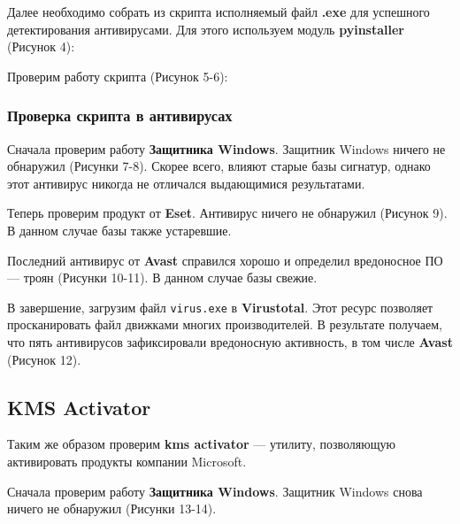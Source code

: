 Далее необходимо собрать из скрипта исполняемый файл \textbf{.exe} для успешного детектирования антивирусами. Для этого используем модуль \textbf{pyinstaller} \linebreak (Рисунок 4):

\FloatBarrier

Проверим работу скрипта (Рисунок 5-6):

\FloatBarrier


\subsubsection{Проверка скрипта в антивирусах}

Сначала проверим работу \textbf{Защитника Windows}. Защитник Windows ничего не обнаружил (Рисунки 7-8). Скорее всего, влияют старые базы сигнатур, однако этот антивирус никогда не отличался выдающимися результатами.

\FloatBarrier

Теперь проверим продукт от \textbf{Eset}. Антивирус ничего не обнаружил (Рисунок 9). В данном случае базы также устаревшие.

\FloatBarrier

Последний антивирус от \textbf{Avast} справился хорошо и определил вредоносное ПО — троян (Рисунки 10-11). В данном случае базы свежие.

\FloatBarrier

В завершение, загрузим файл \texttt{virus.exe} в \textbf{Virustotal}. Этот ресурс позволяет просканировать файл движками многих производителей. В результате получаем, что пять антивирусов зафиксировали вредоносную активность, в том числе \textbf{Avast} (Рисунок 12).

\FloatBarrier
\clearpage

\subsection{KMS Activator}
Таким же образом проверим \textbf{kms activator} — утилиту, позволяющую активировать продукты компании Microsoft. 

Сначала проверим работу \textbf{Защитника Windows}. Защитник Windows снова ничего не обнаружил (Рисунки 13-14).

